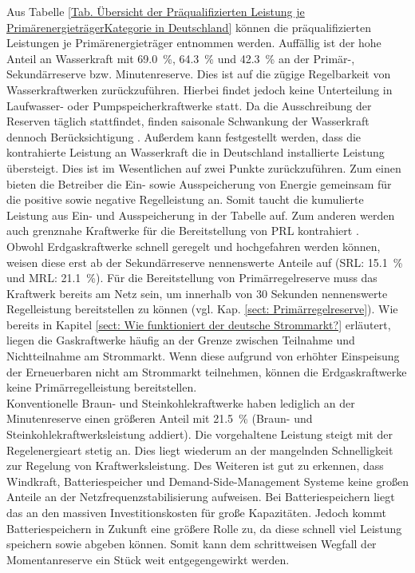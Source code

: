 			Aus Tabelle \ref{Tab. Übersicht der Präqualifizierten Leistung je PrimärenergieträgerKategorie in Deutschland} können die präqualifizierten Leistungen je Primärenergieträger entnommen werden.
			Auffällig ist der hohe Anteil an Wasserkraft mit \SI{69,0}{\percent}, \SI{64,3}{\percent} und \SI{42,3}{\percent} an der Primär-, Sekundärreserve bzw. Minutenreserve.
			Dies ist auf die zügige Regelbarkeit von Wasserkraftwerken zurückzuführen.
			Hierbei findet jedoch keine Unterteilung in Laufwasser- oder Pumpspeicherkraftwerke statt.
			Da die Ausschreibung der Reserven täglich stattfindet, finden saisonale Schwankung der Wasserkraft dennoch Berücksichtigung \cite[S. 80]{Doktorarbeit_Reitsam}. 
			Außerdem kann festgestellt werden, dass die kontrahierte Leistung an Wasserkraft die in Deutschland installierte Leistung übersteigt.
			Dies ist im Wesentlichen auf zwei Punkte zurückzuführen.
			Zum einen bieten die Betreiber die Ein- sowie Ausspeicherung von Energie gemeinsam für die positive sowie negative Regelleistung an.
			Somit taucht die kumulierte Leistung aus Ein- und Ausspeicherung in der Tabelle auf.
			Zum anderen werden auch grenznahe Kraftwerke für die Bereitstellung von PRL kontrahiert \cite[S. 144]{Bericht_Wasserkraft}. \\
			
			Obwohl Erdgaskraftwerke schnell geregelt und hochgefahren werden können, weisen diese erst ab der Sekundärreserve nennenswerte Anteile auf (SRL: \SI{15,1}{\percent} und MRL: \SI{21,1}{\percent}).
			Für die Bereitstellung von Primärregelreserve muss das Kraftwerk bereits am Netz sein, um innerhalb von \num{30} Sekunden nennenswerte Regelleistung bereitstellen zu können (vgl. Kap. \ref{sect: Primärregelreserve}). 
			Wie bereits in Kapitel \ref{sect: Wie funktioniert der deutsche Strommarkt?} erläutert, liegen die Gaskraftwerke häufig an der Grenze zwischen Teilnahme und Nichtteilnahme am Strommarkt.  
			Wenn diese aufgrund von erhöhter Einspeisung der Erneuerbaren nicht am Strommarkt teilnehmen, können die Erdgaskraftwerke keine Primärregelleistung bereitstellen. \\
			
			Konventionelle Braun- und Steinkohlekraftwerke haben lediglich an der Minutenreserve einen größeren Anteil mit \SI{21,5}{\percent} (Braun- und Steinkohlekraftwerksleistung addiert).
			Die vorgehaltene Leistung steigt mit der Regelenergieart stetig an.
			Dies liegt wiederum an der mangelnden Schnelligkeit zur Regelung von Kraftwerksleistung. 
			Des Weiteren ist gut zu erkennen, dass Windkraft, Batteriespeicher und Demand-Side-Management Systeme keine großen Anteile an der Netzfrequenzstabilisierung aufweisen. 
			Bei Batteriespeichern liegt das an den massiven Investitionskosten für große Kapazitäten. 
			Jedoch kommt Batteriespeichern in Zukunft eine größere Rolle zu, da diese schnell viel Leistung speichern sowie abgeben können.
			Somit kann dem schrittweisen Wegfall der Momentanreserve ein Stück weit entgegengewirkt werden. 
			
